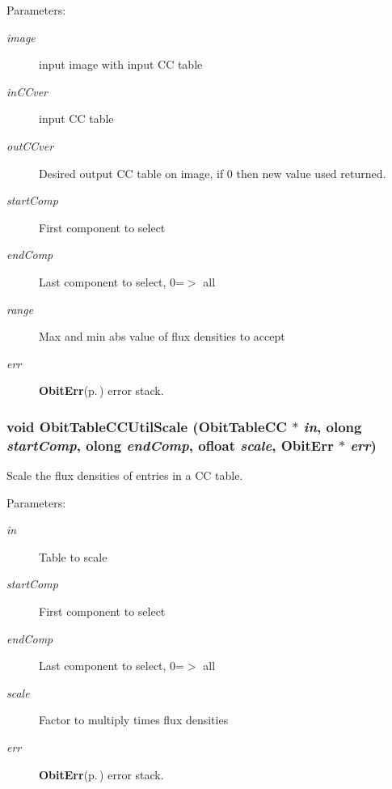 \begin{Desc}
\item[Parameters:]
\begin{description}
\item[{\em image}]input image with input CC table \item[{\em in\-CCver}]input CC table \item[{\em out\-CCver}]Desired output CC table on image, if 0 then new value used returned. \item[{\em start\-Comp}]First component to select \item[{\em end\-Comp}]Last component to select, 0=$>$ all \item[{\em range}]Max and min abs value of flux densities to accept \item[{\em err}]{\bf Obit\-Err}{\rm (p.\,\pageref{structObitErr})} error stack. \end{description}
\end{Desc}
\subsubsection{\setlength{\rightskip}{0pt plus 5cm}void Obit\-Table\-CCUtil\-Scale ({\bf Obit\-Table\-CC} $\ast$ {\em in}, {\bf olong} {\em start\-Comp}, {\bf olong} {\em end\-Comp}, {\bf ofloat} {\em scale}, {\bf Obit\-Err} $\ast$ {\em err})}\label{ObitTableCCUtil_8h_a14}


Scale the flux densities of entries in a CC table. 

\begin{Desc}
\item[Parameters:]
\begin{description}
\item[{\em in}]Table to scale \item[{\em start\-Comp}]First component to select \item[{\em end\-Comp}]Last component to select, 0=$>$ all \item[{\em scale}]Factor to multiply times flux densities \item[{\em err}]{\bf Obit\-Err}{\rm (p.\,\pageref{structObitErr})} error stack. \end{description}
\end{Desc}
